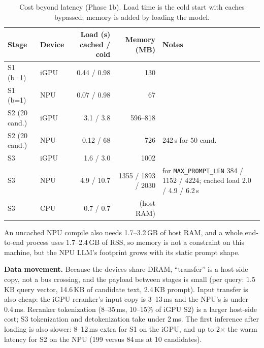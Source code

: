 \documentclass[10pt]{article}
\begin{document}
\begin{table}[!htb]\centering\small
\caption{Cost beyond latency (Phase 1b). Load time is the cold start with caches bypassed; memory is added by loading the model.}\label{tab:cost}
\begin{tabular}{llrrp{4.2cm}}\toprule
Stage & Device & Load (s) cached / cold & Memory (MB) & Notes\\\midrule
S1 (b=1) & iGPU & 0.44 / 0.98 & 130 & \\
S1 (b=1) & NPU & 0.07 / 0.98 & 67 & \\
S2 (20 cand.) & iGPU & 3.1 / 3.8 & 596--818 & \\
S2 (20 cand.) & NPU & 0.12 / 68 & 726 & 242\,s for 50 cand.\\
S3 & iGPU & 1.6 / 3.0 & 1002 & \\
S3 & NPU & 4.9 / 10.7 & 1355 / 1893 / 2030 & for \texttt{MAX\_PROMPT\_LEN} 384 / 1152 / 4224; cached load 2.0 / 4.9 / 6.2\,s\\
S3 & CPU & 0.7 / 0.7 & (host RAM) & \\\bottomrule
\end{tabular}
\end{table}

An uncached NPU compile also needs 1.7--3.2\,GB of host RAM, and a whole end-to-end process uses 1.7--2.4\,GB of RSS, so memory is not a constraint on this machine, but the NPU LLM's footprint grows with its static prompt shape.

\textbf{Data movement.} Because the devices share DRAM, ``transfer'' is a host-side copy, not a bus crossing, and the payload between stages is small (per query: 1.5\,KB query vector, 14.6\,KB of candidate text, 2.4\,KB prompt). Input transfer is also cheap: the iGPU reranker's input copy is 3--13\,ms and the NPU's is under 0.4\,ms. Reranker tokenization (8--35\,ms, 10--15\% of iGPU S2) is a larger host-side cost; S3 tokenization and detokenization take under 2\,ms. The first inference after loading is also slower: 8--12\,ms extra for S1 on the iGPU, and up to 2$\times$ the warm latency for S2 on the NPU (199 versus 84\,ms at 10 candidates).
\end{document}
